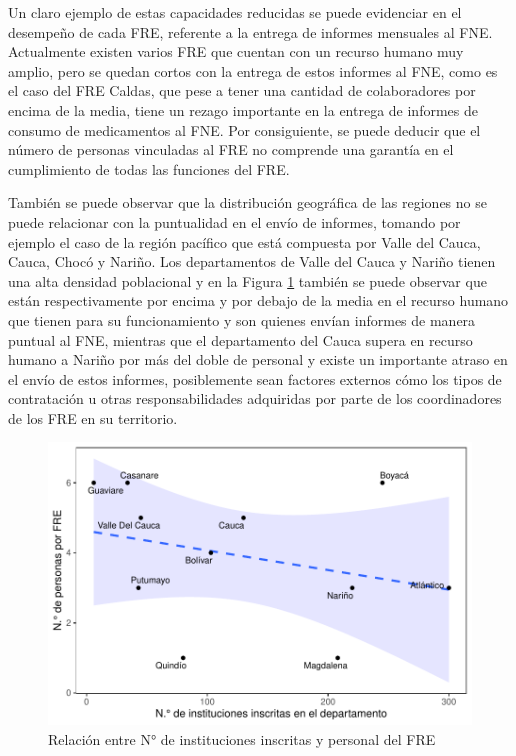 \documentclass[
]{book}
\begin{document}
Un claro ejemplo de estas capacidades reducidas se puede evidenciar en el desempeño de cada FRE, referente a la entrega de informes mensuales al FNE. Actualmente existen varios FRE que cuentan con un recurso humano muy amplio, pero se quedan cortos con la entrega de estos informes al FNE, como es el caso del FRE Caldas, que pese a tener una cantidad de colaboradores por encima de la media, tiene un rezago importante en la entrega de informes de consumo de medicamentos al FNE. Por consiguiente, se puede deducir que el número de personas vinculadas al FRE no comprende una garantía en el cumplimiento de todas las funciones del FRE.

También se puede observar que la distribución geográfica de las regiones no se puede relacionar con la puntualidad en el envío de informes, tomando por ejemplo el caso de la región pacífico que está compuesta por Valle del Cauca, Cauca, Chocó y Nariño. Los departamentos de Valle del Cauca y Nariño tienen una alta densidad poblacional y en la Figura \ref{fig:institucionesInscritasRelacion} también se puede observar que están respectivamente por encima y por debajo de la media en el recurso humano que tienen para su funcionamiento y son quienes envían informes de manera puntual al FNE, mientras que el departamento del Cauca supera en recurso humano a Nariño por más del doble de personal y existe un importante atraso en el envío de estos informes, posiblemente sean factores externos cómo los tipos de contratación u otras responsabilidades adquiridas por parte de los coordinadores de los FRE en su territorio.

\begin{figure}

{\centering \includegraphics[width=0.85\linewidth]{InformeFinal_files/figure-latex/institucionesInscritasRelacion-1} 

}

\caption{Relación entre N° de instituciones inscritas y personal del FRE}\label{fig:institucionesInscritasRelacion}
\end{figure}
\end{document}
